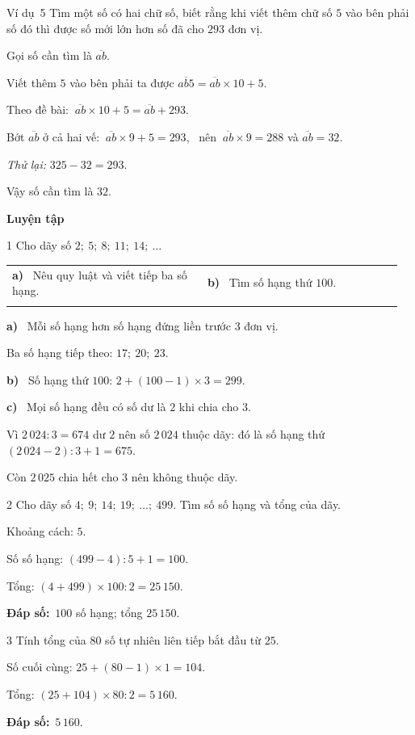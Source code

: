 \documentclass[11pt]{article}
\makeatletter
\newif\ifsol \solfalse
\renewcommand{\arraystretch}{1.35}
\providecommand{\AnsWord}{Đáp số}
\newcommand{\dapso}[1]{\par\textbf{\AnsWord:}\ #1}
\newcommand{\guide}{\par\vspace{4pt}{\bfseries\color{tmBlue}\GuideWord}\par\vspace{3pt}\nopagebreak}
\newcommand{\probsol}[1]{%
  \begin{lrbox}{\solmeasure}\begin{minipage}{\dimexpr\linewidth-24pt\relax}#1\end{minipage}\end{lrbox}%
  \ifsol
    \begin{solbox}#1\end{solbox}%
  \else
    \setlength{\solht}{\dimexpr\ht\solmeasure+\dp\solmeasure+0.85cm\relax}%
    \ifdim\solht<1.35cm\setlength{\solht}{1.35cm}\fi
    \begin{tcolorbox}[colback=white,colframe=Line,boxrule=0.8pt,arc=5pt,
      left=8pt,right=8pt,top=4pt,bottom=4pt,height=\solht]{\footnotesize\color{Slate}\itshape\WorkWord}\end{tcolorbox}%
  \fi}
\newcommand{\dividerbar}[1]{\par\vspace{0.6em}\noindent
  \begin{tcolorbox}[enhanced,frame hidden,interior hidden,borderline west={5pt}{0pt}{ProbBlue},
    colback=white,left=12pt,right=12pt,top=5pt,bottom=5pt,arc=4pt]
  {\large\bfseries\color{ProbBlue} #1}\end{tcolorbox}\vspace{0.4em}}
\newcommand{\nd}[1]{\overline{#1}}
\newcommand{\pa}[1]{\textbf{#1)}\ }
\newenvironment{cols2}{\par\vspace{3pt}\noindent\setlength{\tabcolsep}{0pt}\renewcommand{\arraystretch}{1.3}%
  \begin{tabular}{@{}>{\raggedright\arraybackslash\rule{0pt}{4.4ex}}p{0.48\linewidth}<{\rule[-2.3ex]{0pt}{0pt}}@{\hspace{0.03\linewidth}}>{\raggedright\arraybackslash\rule{0pt}{4.4ex}}p{0.48\linewidth}<{\rule[-2.3ex]{0pt}{0pt}}@{}}}%
  {\end{tabular}\par}
\newcommand{\gap}{\vspace{0.3cm}}
\def\GuideWord{Hướng dẫn giải.}
\def\WorkWord{Bài làm:}
\def\AnsWord{Đáp số}
\def\ExWord{Ví dụ}
\makeatother
\begin{document}
\gap
\begin{exbox}{\ExWord\ 5}
Tìm một số có hai chữ số, biết rằng khi viết thêm chữ số $5$ vào bên phải số đó thì được số mới lớn hơn số đã cho $293$ đơn vị.
\guide
Gọi số cần tìm là $\nd{ab}$.\par Viết thêm $5$ vào bên phải ta được $\nd{ab5}=\nd{ab}\times10+5$.\par
Theo đề bài: $\ \nd{ab}\times10+5=\nd{ab}+293$.\par
Bớt $\nd{ab}$ ở cả hai vế: $\ \nd{ab}\times9+5=293$, \ nên $\ \nd{ab}\times9=288$ và $\nd{ab}=32$.\par
\emph{Thử lại:} $325-32=293$.\par Vậy số cần tìm là $32$.
\end{exbox}
\dividerbar{Luyện tập}
\begin{probbox}{1}{\relax}
Cho dãy số $2;\ 5;\ 8;\ 11;\ 14;\ \dots$
\begin{cols2}
\pa{a} Nêu quy luật và viết tiếp ba số hạng. & \pa{b} Tìm số hạng thứ $100$.\\
\multicolumn{2}{@{}l@{}}{\pa{c} Các số $2\,024$ và $2\,025$ có thuộc dãy không? Nếu có thì đó là số hạng thứ mấy?}
\end{cols2}
\end{probbox}
\probsol{
\pa{a} Mỗi số hạng hơn số hạng đứng liền trước $3$ đơn vị.\par Ba số hạng tiếp theo: $17;\ 20;\ 23$.\par
\pa{b} Số hạng thứ $100$: $2+(100-1)\times3=299$.\par
\pa{c} Mọi số hạng đều có số dư là $2$ khi chia cho $3$.\par Vì $2\,024:3=674$ dư $2$ nên số $2\,024$ thuộc dãy: đó là số hạng thứ $(2\,024-2):3+1=675$.\par Còn $2\,025$ chia hết cho $3$ nên không thuộc dãy.
}
\gap
\begin{probbox}{2}{\relax}
Cho dãy số $4;\ 9;\ 14;\ 19;\ \dots;\ 499$. Tìm số số hạng và tổng của dãy.
\end{probbox}
\probsol{
Khoảng cách: $5$.\par Số số hạng: $(499-4):5+1=100$.\par
Tổng: $(4+499)\times100:2=25\,150$.
\dapso{$100$ số hạng; tổng $25\,150$.}}
\gap
\begin{probbox}{3}{\relax}
Tính tổng của $80$ số tự nhiên liên tiếp bắt đầu từ $25$.
\end{probbox}
\probsol{
Số cuối cùng: $25+(80-1)\times1=104$.\par
Tổng: $(25+104)\times80:2=5\,160$.
\dapso{$5\,160$.}}
\end{document}
